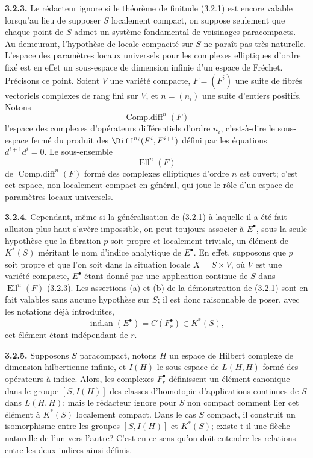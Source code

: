\documentclass[11pt]{article}
\begin{document}
\textbf{3.2.3.} Le rédacteur ignore si le théorème de finitude (3.2.1) est encore valable lorsqu'au lieu de supposer $S$ localement compact, on suppose seulement que chaque point de $S$ admet un système fondamental de voisinages paracompacts. Au demeurant, l'hypothèse de locale compacité sur $S$ ne paraît pas très naturelle. L'espace des paramètres locaux universels pour les complexes elliptiques d'ordre fixé est en effet un sous-espace de dimension infinie d'un espace de Fréchet. Précisons ce point. Soient $V$ une variété compacte, $F=(F^i)$ une suite de fibrés vectoriels complexes de rang fini sur $V$, et $n=(n_i)$ une suite d'entiers positifs. Notons
\[
  \operatorname{Comp.diff}^n(F)
\]
l'espace des complexes d'opérateurs différentiels d'ordre $n_i$, c'est-à-dire le sous-espace fermé du produit des $\Diff^{n_i}(F^i,F^{i+1})$ défini par les équations $d^{i+1}d^i=0$. Le sous-ensemble
\[
  \operatorname{Ell}^n(F)
\]
de $\operatorname{Comp.diff}^n(F)$ formé des complexes elliptiques d'ordre $n$ est ouvert; c'est cet espace, non localement compact en général, qui joue le rôle d'un espace de paramètres locaux universels.

\textbf{3.2.4.} Cependant, même si la généralisation de (3.2.1) à laquelle il a été fait allusion plus haut s'avère impossible, on peut toujours associer à $E^\bullet$, sous la seule hypothèse que la fibration $p$ soit propre et localement triviale, un élément de $K^*(S)$ méritant le nom d'indice analytique de $E^\bullet$. En effet, supposons que $p$ soit propre et que l'on soit dans la situation locale $X=S\times V$, où $V$ est une variété compacte, $E^\bullet$ étant donné par une application continue de $S$ dans $\operatorname{Ell}^n(F)$ (3.2.3). Les assertions (a) et (b) de la démonstration de (3.2.1) sont en fait valables sans aucune hypothèse sur $S$; il est donc raisonnable de poser, avec les notations déjà introduites,
\[
  \operatorname{ind.an}(E^\bullet)=C(F_r^\bullet)\in K^*(S),
\]
cet élément étant indépendant de $r$.

\textbf{3.2.5.} Supposons $S$ paracompact, notons $H$ un espace de Hilbert complexe de dimension hilbertienne infinie, et $I(H)$ le sous-espace de $L(H,H)$ formé des opérateurs à indice. Alors, les complexes $F_r^\bullet$ définissent un élément canonique dans le groupe $[S,I(H)]$ des classes d'homotopie d'applications continues de $S$ dans $L(H,H)$; mais le rédacteur ignore pour $S$ non compact comment lier cet élément à $K^*(S)$ localement compact. Dans le cas $S$ compact, il construit un isomorphisme entre les groupes $[S,I(H)]$ et $K^*(S)$; existe-t-il une flèche naturelle de l'un vers l'autre? C'est en ce sens qu'on doit entendre les relations entre les deux indices ainsi définis.
\end{document}

